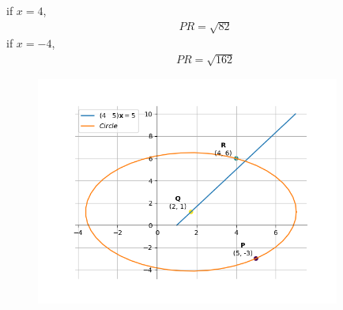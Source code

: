 \documentclass[journal]{IEEEtran}
\begin{document}
if $x=4$,
\begin{align}
    PR=\sqrt{82}
\end{align}
if $x=-4$,
\begin{align}
    PR=\sqrt{162}
\end{align}
\begin{figure}[htp]
    \centering
    \includegraphics[width=10cm]{figs/Figure_1.png}
    \label{fig:enter-label}
\end{figure}
\end{document}
